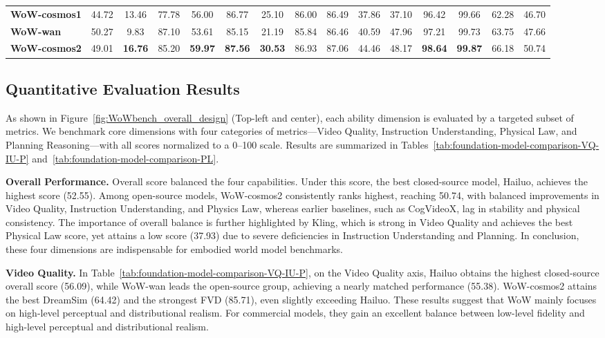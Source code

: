 \begin{table}[t]
{\begin{tabular}{lcccccccccccccc}
\textbf{WoW-cosmos1} & 44.72 & 13.46 & 77.78 & 56.00 & 86.77 & 25.10 & 86.00 & 86.49 & 37.86 & 37.10 & 96.42 & 99.66 & 62.28 & 46.70 \\
\textbf{WoW-wan} & 50.27 & 9.83 & 87.10 & 53.61 & 85.15 & 21.19 & 85.84 & 86.46 & 40.59 & 47.96 & 97.21 & 99.73 & 63.75 & 47.66 \\
\textbf{WoW-cosmos2} & 49.01 & \cellcolor{mylightgreen}\textbf{16.76} & 85.20 & \cellcolor{mylightgreen}\textbf{59.97} & \cellcolor{mylightgreen}\textbf{87.56} & \cellcolor{mylightgreen}\textbf{30.53} & 86.93 & 87.06 & 44.46 & 48.17 & \cellcolor{mylightgreen}\textbf{98.64} & \cellcolor{mylightgreen}\textbf{99.87} & 66.18 & 50.74 \\
\bottomrule
\end{tabular}
}
\end{table}

\subsection{Quantitative Evaluation Results}
\label{ssec:quantitative}
As shown in Figure~\ref{fig:WoWbench_overall_design} (Top-left and center), each ability dimension is evaluated by a targeted subset of metrics. We benchmark core dimensions with four categories of metrics—Video Quality, Instruction Understanding, Physical Law, and Planning Reasoning—with all scores normalized to a 0–100 scale. Results are summarized in Tables~\ref{tab:foundation-model-comparison-VQ-IU-P} and~\ref{tab:foundation-model-comparison-PL}.

\textbf{Overall Performance.} Overall score balanced the four capabilities. Under this score, the best closed-source model, Hailuo, achieves the highest score (52.55). Among open-source models, WoW-cosmos2 consistently ranks highest, reaching 50.74, with balanced improvements in Video Quality, Instruction Understanding, and Physics Law, whereas earlier baselines, such as CogVideoX, lag in stability and physical consistency. The importance of overall balance is further highlighted by Kling, which is strong in Video Quality and achieves the best Physical Law score, yet attains a low score (37.93) due to severe deficiencies in Instruction Understanding and Planning. In conclusion, these four dimensions are indispensable for embodied world model benchmarks.

\textbf{Video Quality.} In Table~\ref{tab:foundation-model-comparison-VQ-IU-P}, on the Video Quality axis, Hailuo obtains the highest closed-source overall score (56.09), while WoW-wan leads the open-source group, achieving a nearly matched performance (55.38). WoW-cosmos2 attains the best DreamSim (64.42) and the strongest FVD (85.71), even slightly exceeding Hailuo. These results suggest that WoW mainly focuses on high-level perceptual and distributional realism. For commercial models, they gain an excellent balance between low-level fidelity and high-level perceptual and distributional realism.


